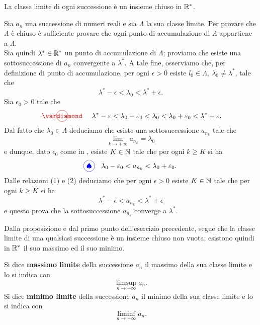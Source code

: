 \begin{proposition}
La classe limite di ogni successione è un insieme chiuso in $\mathbb{R}^{\ast}$.
\end{proposition}
\begin{demonstration}
Sia $a_n$ una successione di numeri reali e sia $\Lambda$ la sua classe limite. Per provare che $\Lambda$ è chiuso è sufficiente provare che ogni punto di accumulazione di $\Lambda$ appartiene a  $\Lambda$.\\
Sia quindi $\lambda^{\ast} \in \mathbb{R}^{\ast}$ un punto di accumulazione di $\Lambda$; proviamo che esiste una sottosuccessione di $a_n$ convergente a $\lambda^{\ast}$. A tale fine, osserviamo che, per definizione di punto di accumulazione, per ogni $\epsilon >0$ esiste $l_0\in \Lambda,\ \lambda_0\neq \lambda^{\ast}$, tale che 
\begin{equation*}
	\lambda^{\ast}-\epsilon < \lambda_0<\lambda^{\ast}+\epsilon.
\end{equation*}
Sia $\epsilon_0>0$ tale che
\begin{equation*}
	\circled[red]{\vardiamond}\quad\lambda^{\ast}-\epsilon < \lambda_0-\epsilon_0< \lambda_0<\lambda_0+\epsilon_0 < \lambda^{\ast}+\epsilon.
\end{equation*}
Dal fatto che $\lambda_0\in \Lambda$ deduciamo che esiste una sottosuccessione $a_{n_k}$ tale che
\begin{equation*}
	\lim_{k\to +\infty} a_{n_k}=\lambda_0
\end{equation*}
e dunque, dato $\epsilon_0$ come in \circled[red]{\vardiamond}, esiste $K\in \mathbb{N}$ tale che per ogni $k\geq K$ si ha
\begin{equation*}
	\circled[blue]{\spadesuit}\quad  \lambda_0-\epsilon_0< a_{n_k}<\lambda_0+\epsilon_0.
\end{equation*}
Dalle relazioni (1) e (2) deduciamo che per ogni $\epsilon >0$ esiste $K\in \mathbb{N}$ tale che per ogni $k\geq K$ si ha
\begin{equation*}
	\lambda^{\ast}-\epsilon< a_{n_k}<\lambda^{\ast}+\epsilon
\end{equation*}
e questo prova che la sottosuccessione $a_{n_k}$ converge a $\lambda^{\ast}$.
\end{demonstration}
Dalla proposizione e dal primo punto dell'esercizio precedente, segue che la classe limite di una qualsiasi successione è un insieme chiuso non vuota; esistono quindi in $\mathbb{R}^{\ast}$ il suo massimo ed il suo minimo.
\begin{define}
Si dice \textbf{massimo limite} della successione $a_n$ il massimo della sua classe limite e lo si indica con 
\begin{equation}
	\limsup_{n\to +\infty} a_{n}.
\end{equation}
Si dice \textbf{minimo limite} della successione $a_n$ il minimo della sua classe limite e lo si indica con
\begin{equation*}
	\liminf_{n\to +\infty} a_{n}.
\end{equation*}
\end{define}
